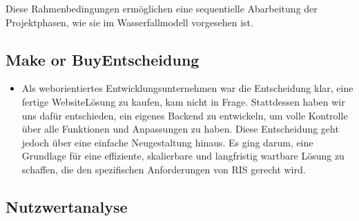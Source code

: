 \documentclass[a4paper,12pt,ngerman]{sphinxmanual}
\begin{document}
\sphinxAtStartPar
Diese Rahmenbedingungen ermöglichen eine sequentielle Abarbeitung der Projektphasen, wie sie im Wasserfallmodell vorgesehen ist.


\subsection{Make or Buy\sphinxhyphen{}Entscheidung}
\label{\detokenize{sections/projektplanung_analyse:make-or-buy-entscheidung}}\begin{itemize}
\item {} 
\sphinxAtStartPar
Als weborientiertes Entwicklungsunternehmen war die Entscheidung klar, eine fertige Website\sphinxhyphen{}Lösung zu kaufen, kam nicht in Frage. Stattdessen haben wir uns dafür entschieden, ein eigenes Backend zu entwickeln, um volle Kontrolle über alle Funktionen und Anpassungen zu haben. Diese Entscheidung geht jedoch über eine einfache Neugestaltung hinaus. Es ging darum, eine Grundlage für eine effiziente, skalierbare und langfristig wartbare Lösung zu schaffen, die den spezifischen Anforderungen von RIS gerecht wird.

\end{itemize}


\subsection{Nutzwertanalyse}
\label{\detokenize{sections/projektplanung_analyse:nutzwertanalyse}}
\end{document}
